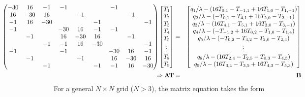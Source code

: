 \documentclass[12pt]{amsart}   %
\begin{document}
\begin{eqnarray} \hspace{-3cm} \begin{pmatrix}
-30 & 16 & -1 &-1&&&-1&&\\
16&-30 & 16 &  &-1&&&-1&\\
-1&16& -30 &  & &-1&&&-1\\
-1&&&-30 & 16 & -1 &-1&\\
&-1&&16& -30 & 16& &-1\\
&&-1&-1&16&  -30 &  &&-1\\
-1&&&-1&&&  -30 &16& -1 \\
&-1&&&-1&&16&  -30 &16\\
&&-1&&&-1&-1&16&  -30 \\
\end{pmatrix} \begin{bmatrix}
T_{1}\\
T_{2}\\
T_{3}\\
T_{4}\\
T_{5}\\
\vdots\\
T_{8}\\
T_{9}\\
\end{bmatrix} &=& 
\begin{bmatrix}
{q_{1}}/{\lambda}-(16T_{0,1}-T_{-1,1}+16T_{1,0}-T_{1,-1})\\
{q_{2}}/{\lambda}-(-T_{0,1}-T_{4,1}+16T_{2,0}-T_{2,-1})\\
{q_{3}}/{\lambda}-(16T_{4,1}-T_{5,1}+16T_{3,0}-T_{3,-1})\\
{q_{4}}/{\lambda}-(-T_{-1,2}+16T_{0,2}-T_{1,0}-T_{1,4})\\
{q_{5}}/{\lambda}-(-T_{0,2}-T_{4,2}-T_{2,0}-T_{2,4})\\
\vdots\\
{q_{8}}/{\lambda}-(16T_{2,4}-T_{2,5}-T_{0,3}-T_{4,3})\\
{q_{9}}/{\lambda}-(16T_{3,4}-T_{3,5}+16T_{4,3}-T_{5,3}) \nonumber\\ 
\end{bmatrix} \\ \Rightarrow \textbf{AT}&=&\textbf{B}
\end{eqnarray}
For a general $N\times N$ grid ($N>3$), the matrix equation takes the form 
\end{document}
